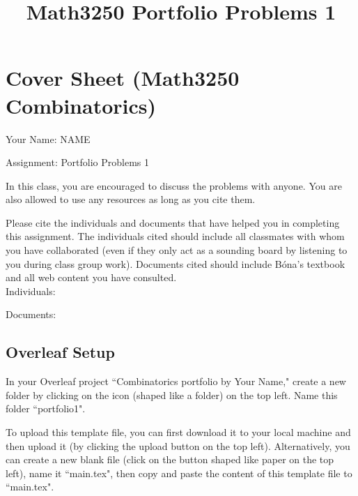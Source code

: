 \documentclass[11pt]{amsart}
\title{Math3250 Portfolio Problems 1}
\begin{document}
\section*{Cover Sheet (Math3250 Combinatorics)}
Your Name: NAME

\vfill 

Assignment: Portfolio Problems 1

\vfill 

\bigskip
In this class, you are encouraged to discuss the problems with anyone. You are also allowed to use any resources as long as you cite them.

Please cite the individuals and documents that have helped you in completing this assignment. 
The individuals cited should include all classmates with whom you have collaborated (even if they only act as a sounding board by listening to you during class group work).
Documents cited should include B\'ona's textbook and all web content you have consulted.
\\


Individuals:

\vfill
\vfill

Documents:

\vfill
\vfill

\newpage


\maketitle



\subsection*{Overleaf Setup}
In your Overleaf project ``Combinatorics portfolio by Your Name," create a new folder by clicking on the icon (shaped like a folder) on the top left. Name this folder ``portfolio1". 

To upload this template file, you can first download it to your local machine and then upload it (by clicking the upload button on the top left).
Alternatively, you can create a new blank file (click on the button shaped like paper on the top left), name it ``main.tex", then copy and paste the content of this template file to ``main.tex".
\end{document}
